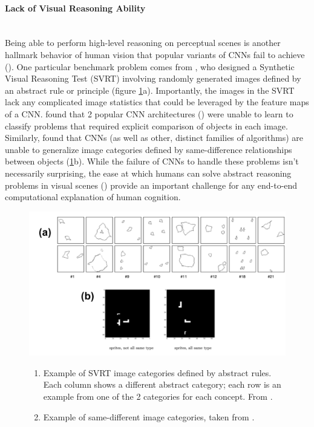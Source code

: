 \documentclass[12pt]{article}
\let\oldcite=\cite
\let\oldtextcite=\textcite
\renewcommand{\cite}[1]{\textcolor[rgb]{0, .121, .388}{\oldcite{#1}}}
\renewcommand{\textcite}[1]{\textcolor[rgb]{0, .121, .388}{\oldtextcite{#1}}}
\begin{document}
\paragraph{Lack of Visual Reasoning Ability}\mbox{} \\

Being able to perform high-level reasoning on perceptual scenes is another hallmark behavior of human vision that popular variants of CNNs fail to achieve (\cite{serre2019deep,gulccehre2016knowledge}). One particular benchmark problem comes from \textcite{fleuret2011comparing}, who designed a Synthetic Visual Reasoning Test (SVRT) involving randomly generated images defined by an abstract rule or principle (figure \ref{fig:abstractProbs}a). Importantly, the images in the SVRT lack any complicated image statistics that could be leveraged by the feature maps of a CNN. \textcite{stabinger201625} found that 2 popular CNN architectures (\cite{lecun1989backpropagation,szegedy2015going}) were unable to learn to classify problems that required explicit comparison of objects in each image. Similarly, \textcite{gulccehre2016knowledge} found that CNNs (as well as other, distinct families of algorithms) are unable to generalize image categories defined by same-difference relationships between objects (\ref{fig:abstractProbs}b). While the failure of CNNs to handle these problems isn't necessarily surprising, the ease at which humans can solve abstract reasoning problems in visual scenes (\cite{fleuret2011comparing}) provide an important challenge for any end-to-end computational explanation of human cognition.

\begin{figure}[!h]
    \centering
    \includegraphics[scale=.4]{figures/abstractProbs.png}
    \caption{}
        \begin{enumerate}[label=(\alph*)]
            \item Example of SVRT image categories defined by abstract rules. Each column shows a different abstract category; each row is an example from one of the 2 categories for each concept. From \textcite{fleuret2011comparing}. 
            \item Example of same-different image categories, taken from \textcite{gulccehre2016knowledge}.
        \end{enumerate}
    \label{fig:abstractProbs}
\end{figure} 
\end{document}
